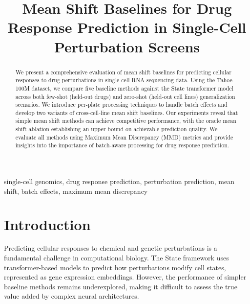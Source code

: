 \documentclass[conference]{IEEEtran}
\begin{document}
\title{Mean Shift Baselines for Drug Response Prediction in Single-Cell Perturbation Screens}

\author{
\and
{}
\and
{}
}

\maketitle

\begin{abstract}
We present a comprehensive evaluation of mean shift baselines for predicting cellular responses to drug perturbations in single-cell RNA sequencing data. Using the Tahoe-100M dataset, we compare five baseline methods against the State transformer model across both few-shot (held-out drugs) and zero-shot (held-out cell lines) generalization scenarios. We introduce per-plate processing techniques to handle batch effects and develop two variants of cross-cell-line mean shift baselines. Our experiments reveal that simple mean shift methods can achieve competitive performance, with the oracle mean shift ablation establishing an upper bound on achievable prediction quality. We evaluate all methods using Maximum Mean Discrepancy (MMD) metrics and provide insights into the importance of batch-aware processing for drug response prediction.
\end{abstract}

\begin{IEEEkeywords}
single-cell genomics, drug response prediction, perturbation prediction, mean shift, batch effects, maximum mean discrepancy
\end{IEEEkeywords}

\section{Introduction}

Predicting cellular responses to chemical and genetic perturbations is a fundamental challenge in computational biology. The State framework uses transformer-based models to predict how perturbations modify cell states, represented as gene expression embeddings. However, the performance of simpler baseline methods remains underexplored, making it difficult to assess the true value added by complex neural architectures.
\end{document}
